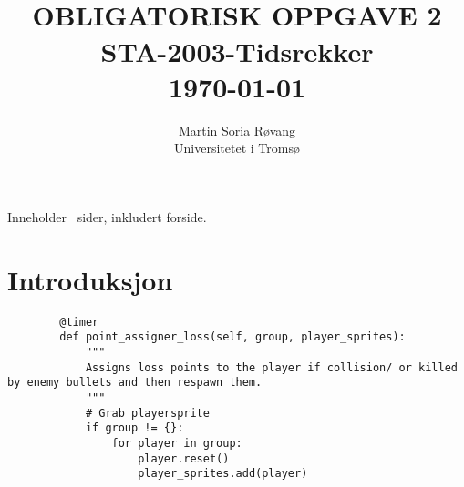 
\usepackage{amssymb}
\usepackage{gensymb}
\usepackage{amsmath}



{\selectfont
\title{ \normalsize \textsc{}
		\\ [1.0cm] %
        \LARGE \textbf{\uppercase{Obligatorisk Oppgave 2}
        \HRule{0.5pt} \\ [0.5cm]
        STA-2003-Tidsrekker
        \\
		\normalsize \today \vspace*{5\baselineskip}}
		}

        \date{}
\author{
		Martin Soria Røvang \\ 
        Universitetet i Tromsø \\}

\clearpage\maketitle
\vspace{0.2\textheight}
{\centering
Inneholder \pageref{LastPage} \, sider, inkludert forside.\par
}
\thispagestyle{empty}

\newpage
\tableofcontents
\newpage


\section{Introduksjon}


    \begin{lstlisting}
        @timer
        def point_assigner_loss(self, group, player_sprites):
            """
            Assigns loss points to the player if collision/ or killed by enemy bullets and then respawn them.
            """
            # Grab playersprite
            if group != {}:
                for player in group:
                    player.reset()
                    player_sprites.add(player)
    \end{lstlisting}








}
